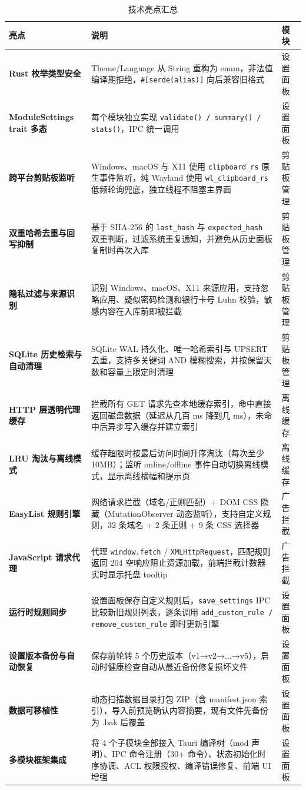 \documentclass[12pt,a4paper]{ctexart}
\begin{document}
\begin{table}[H]
\centering
\footnotesize
\begin{tabularx}{\textwidth}{p{3.2cm}Xp{1.8cm}}
\toprule
亮点 & 说明 & 模块 \\
\midrule
\textbf{Rust 枚举类型安全} & Theme/Language 从 String 重构为 enum，非法值编译期拒绝，\texttt{\#[serde(alias)]} 向后兼容旧格式 & 设置面板 \\
\textbf{ModuleSettings trait 多态} & 每个模块独立实现 \texttt{validate() / summary() / stats()}，IPC 统一调用 & 设置面板 \\
\textbf{跨平台剪贴板监听} & Windows、macOS 与 X11 使用 \texttt{clipboard\_rs} 原生事件监听，纯 Wayland 使用 \texttt{wl\_clipboard\_rs} 低频轮询兜底，独立线程不阻塞主界面 & 剪贴板管理 \\
\textbf{双重哈希去重与回写抑制} & 基于 SHA-256 的 \texttt{last\_hash} 与 \texttt{expected\_hash} 双重判断，过滤系统重复通知，并避免从历史面板复制时再次入库 & 剪贴板管理 \\
\textbf{隐私过滤与来源识别} & 识别 Windows、macOS、X11 来源应用，支持忽略应用、疑似密码检测和银行卡号 Luhn 校验，敏感内容在入库前即被拦截 & 剪贴板管理 \\
\textbf{SQLite 历史检索与自动清理} & SQLite WAL 持久化、唯一哈希索引与 UPSERT 去重，支持多关键词 AND 模糊搜索，并按保留天数和容量上限定时清理 & 剪贴板管理 \\
\textbf{HTTP 层透明代理缓存} & 拦截所有 GET 请求先查本地缓存索引，命中直接返回磁盘数据（延迟从几百 ms 降到几 ms），未命中后异步写入缓存并建立索引 & 离线缓存 \\
\textbf{LRU 淘汰与离线模式} & 缓存超限时按最后访问时间升序淘汰（每次至少 10MB）；监听 online/offline 事件自动切换离线模式，显示离线横幅和提示页 & 离线缓存 \\
\textbf{EasyList 规则引擎} & 网络请求拦截（域名/正则匹配）+ DOM CSS 隐藏（MutationObserver 动态监听），支持自定义规则，32 条域名 + 2 条正则 + 9 条 CSS 选择器 & 广告拦截 \\
\textbf{JavaScript 请求代理} & 代理 \texttt{window.fetch} / \texttt{XMLHttpRequest}，匹配规则返回 204 空响应阻止资源加载，前端拦截计数器实时显示托盘 tooltip & 广告拦截 \\
\textbf{运行时规则同步} & 设置面板保存自定义规则后，\texttt{save\_settings} IPC 比较新旧规则列表，逐条调用 \texttt{add\_custom\_rule / remove\_custom\_rule} 即时更新引擎 & 设置面板 \\
\textbf{设置版本备份与自动恢复} & 保存前轮转 5 个历史版本（v1→v2→...→v5），启动时健康检查自动从最近备份修复损坏文件 & 设置面板 \\
\textbf{数据可移植性} & 动态扫描数据目录打包 ZIP（含 manifest.json 索引），导入前预览确认内容摘要，现有文件先备份为 .bak 后覆盖 & 设置面板 \\
\textbf{多模块框架集成} & 将 4 个子模块全部接入 Tauri 编译树（mod 声明）、IPC 命令注册（30+ 命令）、状态初始化时序协调、ACL 权限授权、编译错误修复、前端 UI 增强 & 设置面板 \\
\bottomrule
\end{tabularx}
\caption{技术亮点汇总}
\end{table}
\end{document}
